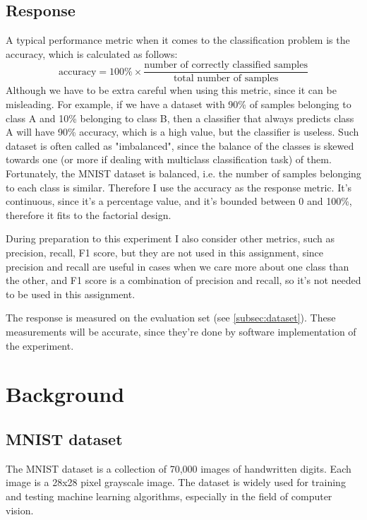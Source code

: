 \documentclass{article}
\begin{document}
\subsection{Response}
A typical performance metric when it comes to the classification problem is the accuracy, which is calculated as follows:
\begin{equation}
    \text{accuracy} = 100\%\times\frac{\text{number of correctly classified samples}}{\text{total number of samples}}
\end{equation}
Although we have to be extra careful when using this metric, since it can be misleading. For example, if we have a dataset with 90\% of samples belonging to class A and 10\% belonging to class B, then a classifier that always predicts class A will have 90\% accuracy, which is a high value, but the classifier is useless. Such dataset is often called as "imbalanced", since the balance of the classes is skewed towards one (or more if dealing with multiclass classification task) of them. Fortunately, the MNIST dataset is balanced, i.e. the number of samples belonging to each class is similar. Therefore I use the accuracy as the response metric. It's continuous, since it's a percentage value, and it's bounded between 0 and 100\%, therefore it fits to the factorial design.

During preparation to this experiment I also consider other metrics, such as precision, recall, F1 score, but they are not used in this assignment, since precision and recall are useful in cases when we care more about one class than the other, and F1 score is a combination of precision and recall, so it's not needed to be used in this assignment.

The response is measured on the evaluation set (see \ref{subsec:dataset}). These measurements will be accurate, since they're done by software implementation of the experiment.

\section{Background}

\subsection{MNIST dataset}
\label{subsec:mnist}
The MNIST dataset is a collection of 70,000 images of handwritten digits. Each image is a 28x28 pixel grayscale image. The dataset is widely used for training and testing machine learning algorithms, especially in the field of computer vision.
\end{document}
